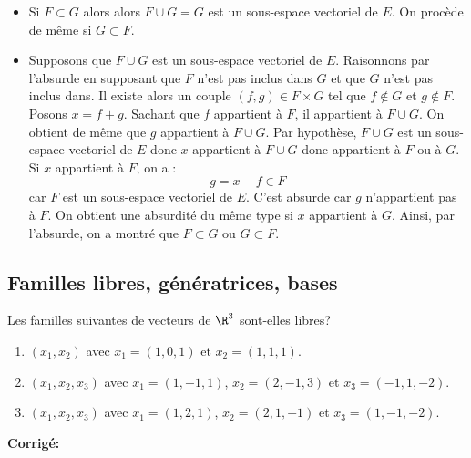 \documentclass[a4paper,twoside,french,10pt]{VcCours}
\newcommand{\corr}{\textbf{Corrigé:}}
\begin{document}
\begin{itemize}
\item Si $F \subset G$ alors alors $F \cup G = G$ est un sous-espace vectoriel de $E$. On procède de même si $G \subset F$.
\item Supposons que $F \cup G$ est un sous-espace vectoriel de $E$. Raisonnons par l'absurde en supposant que $F$ n'est pas inclus dans $G$ et que $G$ n'est pas inclus dans. Il existe alors un couple $(f,g) \in F \times G$ tel que $f \notin G$ et $g \notin F$. Posons $x=f+g$. Sachant que $f$ appartient à $F$, il appartient à $F \cup G$. On obtient de même que $g$ appartient à $F \cup G$. Par hypothèse, $F \cup G$ est un sous-espace vectoriel de $E$ donc $x$ appartient à $F \cup G$ donc appartient à $F$ ou à $G$. Si $x$ appartient à $F$, on a :
$$ g = x-f \in F$$
car $F$ est un sous-espace vectoriel de $E$. C'est absurde car $g$ n'appartient pas à $F$. On obtient une absurdité du même type si $x$ appartient à $G$. Ainsi, par l'absurde, on a montré que $F \subset G$ ou $G \subset F$. 
\end{itemize}

\medskip

\subsection{\large Familles libres, génératrices, bases}

\medskip

\begin{Exercice}{} Les familles suivantes de vecteurs de $\R^3$ sont-elles libres?
   \begin{enumerate}
  \item
        $(x_1 ,x_2)$ avec $x_1 = (1,0,1)$ et $x_2 = (1,1,1)$.
      \item
        $(x_1 ,x_2 ,x_3)$ avec $x_1 = (1, - 1,1)$, $x_2 = (2, - 1,3)$ et $x_3 = ( - 1,1, - 2)$.
      \item
        $(x_1 ,x_2 ,x_3)$ avec $x_1 = (1,2,1)$, $x_2 = (2,1, - 1)$ et $x_3 = (1, - 1, - 2)$.
    \end{enumerate}
\end{Exercice}

\corr 
\end{document}
